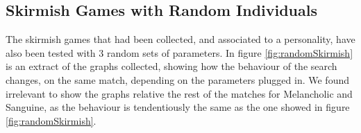 \subsection{Skirmish Games with Random Individuals}\label{sec:skirmishrandom}
The skirmish games that had been collected, and associated to a personality, have also been tested with 3 random sets of parameters. In figure \ref{fig:randomSkirmish} is an extract of the graphs collected, showing how the behaviour of the search changes, on the same match, depending on the parameters plugged in. We found irrelevant to show the graphs relative the rest of the matches for Melancholic and Sanguine, as the behaviour is tendentiously the same as the one showed in figure \ref{fig:randomSkirmish}.
\begin{figure}[h]
\centering

\end{figure}
